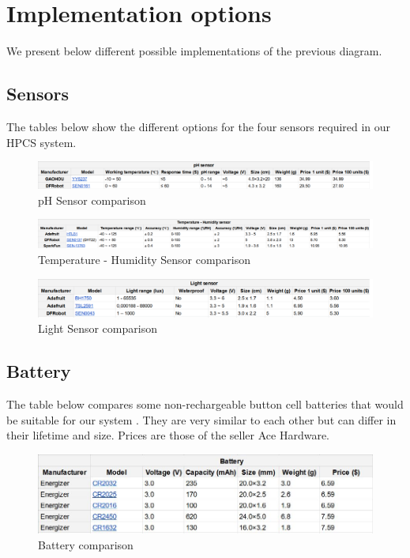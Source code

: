 \section{Implementation options}
We present below different possible implementations of the previous diagram.

\subsection{Sensors}
The tables below show the different options for the four sensors required in our HPCS system.

\begin{figure}[h]
    \includegraphics[width=\linewidth]{images/ph-sensor-comparison.png}
    \caption{pH Sensor comparison}
    \label{fig:pH Sensor Comparison}
\end{figure}

\begin{figure}[h]
    \includegraphics[width=\linewidth]{images/temp-hum-sensor-comparison.png}
    \caption{Temperature - Humidity Sensor comparison}
    \label{fig:Temperature - Humidity Sensor Comparison}
\end{figure}

\begin{figure}[h]
    \includegraphics[width=\linewidth]{images/light-sensor-comparison.png}
    \caption{Light Sensor comparison}
    \label{fig:Light Sensor Comparison}
\end{figure}
\subsection{Battery}
The table below compares some non-rechargeable button cell batteries that would be suitable for our system \cite{b7}.
They are very similar to each other but can differ in their lifetime and size. Prices are those of the seller Ace Hardware.
\begin{figure}[h]
    \includegraphics[width=\linewidth]{images/battery-comparison.jpg}
    \caption{Battery comparison}
    \label{fig:Battery Comparison}
\end{figure}

